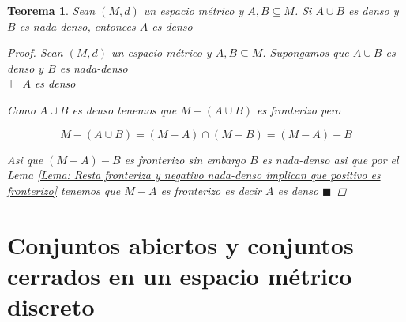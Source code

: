 \documentclass[oneside]{book} %
\theoremstyle{Teorema}
\newtheorem{Teorema}[Definicion]{Teorema}
\theoremstyle{Ejemplos}
\theoremstyle{[Obs]}
\renewcommand{\{}{\left\lbrace} %
\renewcommand{\}}{\right\rbrace} %
\renewcommand{\u}{\cup} %
\newcommand{\n}{\cap} %
\renewcommand{\sc}{\subseteq} %
\renewcommand{\qed}{$\blacksquare$} %
\newcommand{\pd}{$\vdash\ $} %
\begin{document}
			\begin{Teorema}\setlength{\parindent}{0em}
			
				Sean $(M, d)$ un espacio métrico y $A, B \sc M$. Si $A \u B$ es denso y $B$ es nada-denso, entonces $A$ es denso

				\begin{proof}
					
					Sean $(M, d)$ un espacio métrico y $A, B \sc M$. Supongamos que $A \u B$ es denso y $B$ es nada-denso \\ 
					\pd $A$ es denso 

					Como $A \u B$ es denso tenemos que $M - (A \u B)$ es fronterizo pero 

					\[ M - (A \u B) = (M - A) \n (M - B) = (M - A) - B \]
					
					Asi que $(M - A) - B$ es fronterizo sin embargo $B$ es nada-denso asi que por el Lema \ref{Lema: Resta fronteriza y negativo nada-denso implican que positivo es fronterizo} tenemos que $M - A$ es fronterizo es decir $A$ es denso \qed

				\end{proof}
			
			\end{Teorema}

		\section{Conjuntos abiertos y conjuntos cerrados en un espacio métrico discreto}
\end{document}
